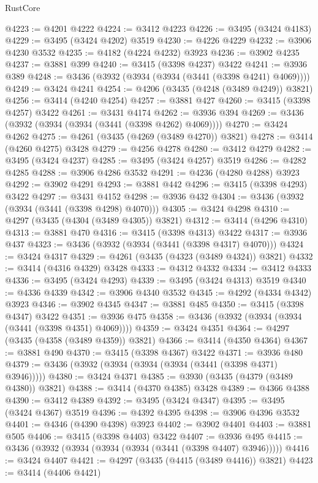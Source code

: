 \begin{lexlean}{RustCore}
\begin{coremodule}
@4223 := @4201 @4222
@4224 := @3412 @4223
@4226 := @3495 (@3424 @4183)
@4229 := @3495 (@3424 @4202) @3519
@4230 := @4226 @4229
@4232 := @3906 @4230 @3532
@4235 := @4182 (@4224 @4232) @3923
@4236 := @3902 @4235
@4237 := @3881 @399
@4240 := @3415 (@3398 @4237) @3422
@4241 := @3936 @389
@4248 := @3436 (@3932 (@3934 (@3934 (@3441 (@3398 @4241) @4069))))
@4249 := @3424 @4241
@4254 := @4206 (@3435 (@4248 (@3489 @4249)) @3821)
@4256 := @3414 (@4240 @4254)
@4257 := @3881 @427
@4260 := @3415 (@3398 @4257) @3422
@4261 := @3431 @4174
@4262 := @3936 @394
@4269 := @3436 (@3932 (@3934 (@3934 (@3441 (@3398 @4262) @4069))))
@4270 := @3424 @4262
@4275 := @4261 (@3435 (@4269 (@3489 @4270)) @3821)
@4278 := @3414 (@4260 @4275) @3428
@4279 := @4256 @4278
@4280 := @3412 @4279
@4282 := @3495 (@3424 @4237)
@4285 := @3495 (@3424 @4257) @3519
@4286 := @4282 @4285
@4288 := @3906 @4286 @3532
@4291 := @4236 (@4280 @4288) @3923
@4292 := @3902 @4291
@4293 := @3881 @442
@4296 := @3415 (@3398 @4293) @3422
@4297 := @3431 @4152
@4298 := @3936 @432
@4304 := @3436 (@3932 (@3934 (@3441 (@3398 @4298) @4070)))
@4305 := @3424 @4298
@4310 := @4297 (@3435 (@4304 (@3489 @4305)) @3821)
@4312 := @3414 (@4296 @4310)
@4313 := @3881 @470
@4316 := @3415 (@3398 @4313) @3422
@4317 := @3936 @437
@4323 := @3436 (@3932 (@3934 (@3441 (@3398 @4317) @4070)))
@4324 := @3424 @4317
@4329 := @4261 (@3435 (@4323 (@3489 @4324)) @3821)
@4332 := @3414 (@4316 @4329) @3428
@4333 := @4312 @4332
@4334 := @3412 @4333
@4336 := @3495 (@3424 @4293)
@4339 := @3495 (@3424 @4313) @3519
@4340 := @4336 @4339
@4342 := @3906 @4340 @3532
@4345 := @4292 (@4334 @4342) @3923
@4346 := @3902 @4345
@4347 := @3881 @485
@4350 := @3415 (@3398 @4347) @3422
@4351 := @3936 @475
@4358 := @3436 (@3932 (@3934 (@3934 (@3441 (@3398 @4351) @4069))))
@4359 := @3424 @4351
@4364 := @4297 (@3435 (@4358 (@3489 @4359)) @3821)
@4366 := @3414 (@4350 @4364)
@4367 := @3881 @490
@4370 := @3415 (@3398 @4367) @3422
@4371 := @3936 @480
@4379 := @3436 (@3932 (@3934 (@3934 (@3934 (@3441 (@3398 @4371) @3946)))))
@4380 := @3424 @4371
@4385 := @3930 (@3435 (@4379 (@3489 @4380)) @3821)
@4388 := @3414 (@4370 @4385) @3428
@4389 := @4366 @4388
@4390 := @3412 @4389
@4392 := @3495 (@3424 @4347)
@4395 := @3495 (@3424 @4367) @3519
@4396 := @4392 @4395
@4398 := @3906 @4396 @3532
@4401 := @4346 (@4390 @4398) @3923
@4402 := @3902 @4401
@4403 := @3881 @505
@4406 := @3415 (@3398 @4403) @3422
@4407 := @3936 @495
@4415 := @3436 (@3932 (@3934 (@3934 (@3934 (@3441 (@3398 @4407) @3946)))))
@4416 := @3424 @4407
@4421 := @4297 (@3435 (@4415 (@3489 @4416)) @3821)
@4423 := @3414 (@4406 @4421)

\end{coremodule}
\end{lexlean}
